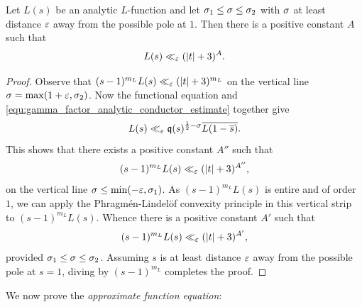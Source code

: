 \documentclass[12pt]{article}
\begin{document}
    \begin{proposition}\label{prop:L_function_bounded_in_vertical_strips}
      Let \(L(s)\) be an analytic \(L\)-function and let \(\sigma_{1} \le \sigma \le \sigma_{2}\) with \(\sigma\) at least distance \(\varepsilon\) away from the possible pole at \(1\). Then there is a positive constant \(A\) such that
      \[
        L(s) \ll_{\varepsilon} (|t|+3)^{A}.
      \]
    \end{proposition}
    \begin{proof}
      Observe that \((s-1)^{m_{L}}L(s) \ll_{\varepsilon} (|t|+3)^{m_{L}}\) on the vertical line \(\sigma = \max(1+\varepsilon,\sigma_{2})\). Now the functional equation and \cref{equ:gamma_factor_analytic_conductor_estimate} together give
      \[
        L(s) \ll_{\varepsilon} \mathfrak{q}(s)^{\frac{1}{2}-\sigma}\overline{L(1-\overline{s})}.
      \]
      This shows that there exists a positive constant \(A''\) such that
      \[
        (s-1)^{m_{L}}L(s) \ll_{\varepsilon} (|t|+3)^{A''},
      \]
      on the vertical line \(\sigma \le \min(-\varepsilon,\sigma_{1})\). As \((s-1)^{m_{L}}L(s)\) is entire and of order \(1\), we can apply the Phragm\'en-Lindel\"of convexity principle in this vertical strip to \((s-1)^{m_{L}}L(s)\). Whence there is a positive constant \(A'\) such that
      \[
        (s-1)^{m_{L}}L(s) \ll_{\varepsilon} (|t|+3)^{A'},
      \]
      provided \(\sigma_{1} \le \sigma \le \sigma_{2}\). Assuming \(s\) is at least distance \(\varepsilon\) away from the possible pole at \(s = 1\), diving by \((s-1)^{m_{L}}\) completes the proof.
    \end{proof}

    We now prove the \textit{approximate function equation}:
\end{document}
